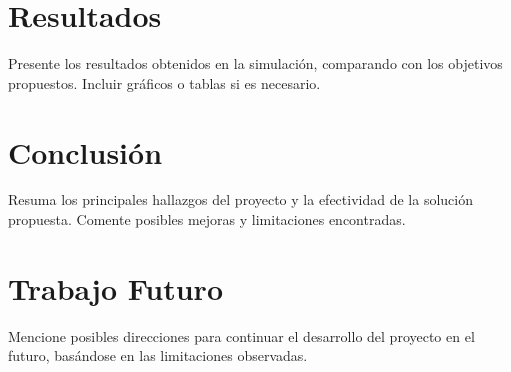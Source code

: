 \documentclass[sjournal]{IEEEtran}
\begin{document}
\section{Resultados}
Presente los resultados obtenidos en la simulación, comparando con los objetivos propuestos. Incluir gráficos o tablas si es necesario.

\section{Conclusión}
Resuma los principales hallazgos del proyecto y la efectividad de la solución propuesta. Comente posibles mejoras y limitaciones encontradas.

\section{Trabajo Futuro}
Mencione posibles direcciones para continuar el desarrollo del proyecto en el futuro, basándose en las limitaciones observadas.




\end{document}
